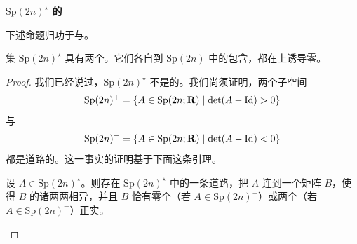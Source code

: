 \textbf{$\mathrm{Sp}(2n)^\star$ 的\trTopology}

下述命题归功于\trConley{}与\trZehnder。

\begin{proposition}[{[21]}]\label{thm:sp-star-components}
\trOpen{}集 $\mathrm{Sp}(2n)^\star$ 具有两个\trConnectedComponent。它们各自到 $\mathrm{Sp}(2n)$ 中的包含，都在\trFundamentalGroup{}上诱导零\trHomomorphism。
\end{proposition}

\begin{proof}
我们已经说过，$\mathrm{Sp}(2n)^\star$ 不是\trConnected{}的。我们尚须证明，两个子空间
\[
\mathrm{Sp}(2n)^{+}=\{A\in\mathrm{Sp}(2n;\mathbf{R})\mid\det(A-\mathrm{Id})>0\}
\]
与
\[
\mathrm{Sp}(2n)^{-}=\{A\in\mathrm{Sp}(2n;\mathbf{R})\mid\det(A-\mathrm{Id})<0\}
\]
都是道路\trConnected{}的。这一事实的证明基于下面这条引理。

\begin{lemma}\label{thm:distinct-positive-eigenvalues}
设 $A\in\mathrm{Sp}(2n)^\star$。则存在 $\mathrm{Sp}(2n)^\star$ 中的一条道路，把 $A$ 连到一个矩阵 $B$，使得 $B$ 的诸\trEigenvalue{}两两相异，并且 $B$ 恰有零个（若 $A\in\mathrm{Sp}(2n)^{+}$）或两个（若 $A\in\mathrm{Sp}(2n)^{-}$）正实\trEigenvalue。
\end{lemma}


\end{proof}
